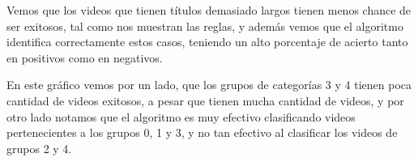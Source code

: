         \begin{figure}[ht]
        \end{figure}
        \FloatBarrier

        Vemos que los videos que tienen títulos demasiado largos tienen menos
        chance de ser exitosos, tal como nos muestran las reglas, y además vemos
        que el algoritmo identifica correctamente estos casos, teniendo un alto
        porcentaje de acierto tanto en positivos como en negativos.

        \begin{figure}[ht]
        \end{figure}
        \FloatBarrier

        En este gráfico vemos por un lado, que los grupos de categorías 3 y 4
        tienen poca cantidad de videos exitosos, a pesar que tienen mucha
        cantidad de videos, y por otro lado notamos que el algoritmo es muy
        efectivo clasificando videos pertenecientes a los grupos 0, 1 y 3, y
        no tan efectivo al clasificar los videos de grupos 2 y 4.

        \begin{figure}[ht]
        \end{figure}
        \FloatBarrier

